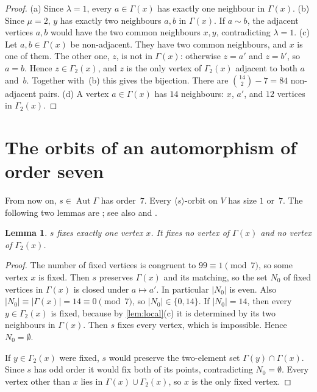 \documentclass[11pt,a4paper]{amsart}
\newtheorem{lemma}[theorem]{Lemma}
\theoremstyle{definition}
\theoremstyle{remark}
\DeclareMathOperator{\Aut}{Aut}
\begin{document}
\begin{proof}
(a) Since $\lambda=1$, every $a\in\Gamma(x)$ has exactly one neighbour in $\Gamma(x)$.
(b) Since $\mu=2$, $y$ has exactly two neighbours $a,b$ in $\Gamma(x)$. If $a\sim b$, the adjacent vertices
$a,b$ would have the two common neighbours $x,y$, contradicting $\lambda=1$.
(c) Let $a,b\in\Gamma(x)$ be non-adjacent. They have two common neighbours, and $x$ is one of them. The other
one, $z$, is not in $\Gamma(x)$: otherwise $z=a'$ and $z=b'$, so $a=b$. Hence $z\in\Gamma_2(x)$, and $z$ is the
only vertex of $\Gamma_2(x)$ adjacent to both $a$ and~$b$. Together with~(b) this gives the bijection. There
are $\binom{14}{2}-7=84$ non-adjacent pairs.
(d) A vertex $a\in\Gamma(x)$ has $14$ neighbours: $x$, $a'$, and $12$ vertices in $\Gamma_2(x)$.
\end{proof}

\section{The orbits of an automorphism of order seven}\label{sec:orbits}

From now on, $s\in\Aut\Gamma$ has order~$7$. Every $\langle s\rangle$-orbit on $V$ has size $1$ or~$7$. The
following two lemmas are \cite[Lemma~2.2 and Remark~2.3]{CW25}; see also \cite{MM04} and \cite[\S8]{LM14}.

\begin{lemma}\label{lem:fixed}
$s$ fixes exactly one vertex $x$. It fixes no vertex of $\Gamma(x)$ and no vertex of $\Gamma_2(x)$.
\end{lemma}

\begin{proof}
The number of fixed vertices is congruent to $99\equiv1\pmod7$, so some vertex $x$ is fixed. Then $s$
preserves $\Gamma(x)$ and its matching, so the set $N_0$ of fixed vertices in $\Gamma(x)$ is closed under
$a\mapsto a'$. In particular $|N_0|$ is even. Also $|N_0|\equiv|\Gamma(x)|=14\equiv0\pmod7$, so
$|N_0|\in\{0,14\}$. If $|N_0|=14$, then every $y\in\Gamma_2(x)$ is fixed, because by
\cref{lem:local}(c) it is determined by its two neighbours in $\Gamma(x)$. Then $s$ fixes every vertex,
which is impossible. Hence $N_0=\emptyset$.

If $y\in\Gamma_2(x)$ were fixed, $s$ would preserve the two-element set $\Gamma(y)\cap\Gamma(x)$. Since $s$ has
odd order it would fix both of its points, contradicting $N_0=\emptyset$. Every vertex other than $x$ lies
in $\Gamma(x)\cup\Gamma_2(x)$, so $x$ is the only fixed vertex.
\end{proof}
\end{document}
